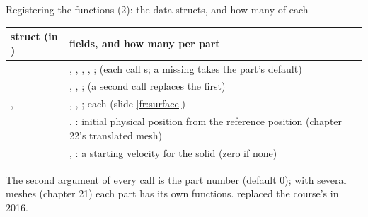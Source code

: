 \documentclass[aspectratio=169,11pt]{beamer}
\begin{document}
\begin{frame}{Registering the functions (2): the data structs, and how many of each}
\label{fr:register2}
\footnotesize
\begin{tabular}{@{}L{0.30\textwidth}L{0.62\textwidth}@{}}
\toprule
struct (in ) & fields, and how many per part \\
\midrule
{} & , , , , ;  (each call s; a missing  takes the part's default) \\
 & , , ;  (a second call replaces the first) \\
,  & , , ;  each (slide \ref{fr:surface}) \\
 & , : initial physical position from the reference position (chapter 22's translated mesh) \\
 & , : a starting velocity for the solid (zero if none) \\
\bottomrule
\end{tabular}

\medskip
The second argument of every  call is the part number (default $0$); with several meshes (chapter 21) each part has its own functions.  replaced the course's  in 2016.
\end{frame}
\end{document}

